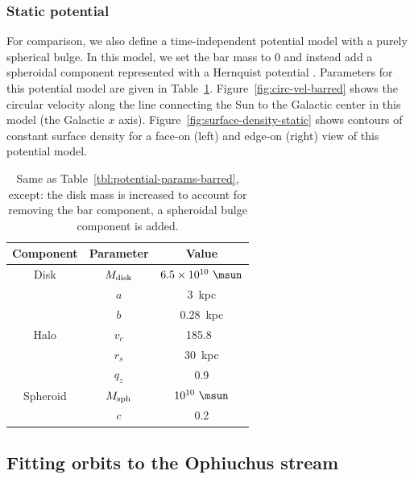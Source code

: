 \documentclass[letterpaper,12pt,preprint]{aastex}
\begin{document}
\subsubsection{Static potential}

For comparison, we also define a time-independent potential model with a purely spherical bulge. In this model, we set the bar mass to 0 and instead add a spheroidal component represented with a Hernquist potential \citep{hernquist90}. Parameters for this potential model are given in Table~\ref{tbl:potential-params-static}. Figure~\ref{fig:circ-vel-barred} shows the circular velocity along the line connecting the Sun to the Galactic center in this model (the Galactic $x$ axis). Figure~\ref{fig:surface-density-static} shows contours of constant surface density for a face-on (left) and edge-on (right) view of this potential model.

\begin{table}[ht]
\begin{center}
	\begin{tabular}{ c | c | c }
	         \toprule
	         Component & Parameter & Value \\\toprule
		Disk & $M_{\rm disk}$ & $6.5 \times 10^{10}~\msun$ \\
		& $a$ & 3~{\rm kpc}\\
		& $b$ & 0.28~{\rm kpc} \\\midrule
	         Halo & $v_c$ & 185.8~\kms\\
		& $r_s$ & 30~kpc \\
		& $q_z$ & 0.9 \\\midrule
		Spheroid & $M_{\rm sph}$ & $10^{10}~\msun$ \\
		& $c$ & 0.2 \\
		\bottomrule
		\end{tabular}
	\caption{Same as Table~\ref{tbl:potential-params-barred}, except: the disk mass is increased to account for removing the bar component, a spheroidal bulge component is added. \label{tbl:potential-params-static}}
\end{center}
\end{table}

\subsection{Fitting orbits to the Ophiuchus stream}\label{sec:orbitfit}
\end{document}
